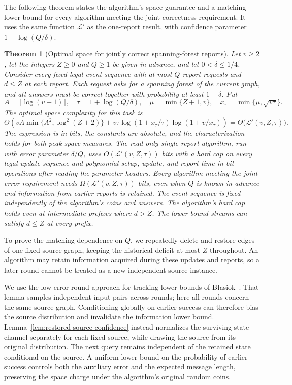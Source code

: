 \documentclass[11pt,letterpaper]{article}
\newtheorem{theorem}{Theorem}[section]
\numberwithin{equation}{section}
\begin{document}
The following theorem states the algorithm's space guarantee and a matching lower bound for every algorithm meeting the joint correctness requirement.
It uses the same function $\mathcal L'$ as the one-report result, with confidence parameter $1+\log(Q/\delta)$.

\begin{theorem}[Optimal space for jointly correct spanning-forest reports]
\label{thm:joint-report-implementation}
Let $v\ge2$, let the integers $Z\ge0$ and $Q\ge1$ be given in advance, and let $0<\delta\le1/4$.
Consider every fixed legal event sequence with at most $Q$ report requests and $d\le Z$ at each report.
Each request asks for a spanning forest of the current graph, and all answers must be correct together with probability at least $1-\delta$.
Put
\[
 A=\lceil\log(v+1)\rceil,\quad
 \tau=1+\log(Q/\delta),\quad
 \mu=\min\{Z+1,v\},\quad x_\tau=\min\{\mu,\sqrt{v\tau}\}.
\]
The optimal space complexity for this task is
\begin{equation}
\Theta\!\left(
 vA\min\{A^2,\log^2(Z+2)\}
 +v\tau\log(1+x_\tau/\tau)\log(1+v/x_\tau)
 \right)
 =\Theta\bigl(\mathcal L'(v,Z,\tau)\bigr).          \label{eq:sj9}
\end{equation}
The expression is in bits, the constants are absolute, and the characterization holds for both peak-space measures.
The read-only single-report algorithm, run with error parameter $\delta/Q$, uses $O(\mathcal L'(v,Z,\tau))$ bits with a hard cap on every legal update sequence and polynomial setup, update, and report time in bit operations after reading the parameter headers.
Every algorithm meeting the joint error requirement needs $\Omega(\mathcal L'(v,Z,\tau))$ bits, even when $Q$ is known in advance and information from earlier reports is retained.
The event sequence is fixed independently of the algorithm's coins and answers.
The algorithm's hard cap holds even at intermediate prefixes where $d>Z$.
The lower-bound streams can satisfy $d\le Z$ at every prefix.
\end{theorem}

To prove the matching dependence on $Q$, we repeatedly delete and restore edges of one fixed source graph, keeping the historical deficit at most $Z$ throughout.
An algorithm may retain information acquired during these updates and reports, so a later round cannot be treated as a new independent source instance.

We use the low-error-round approach for tracking lower bounds of B{\l}asiok~\cite[Section~7, Lemma~29 of the full version]{Blasiok2018}.
That lemma samples independent input pairs across rounds; here all rounds concern the same source graph.
Conditioning globally on earlier success can therefore bias the source distribution and invalidate the information lower bound.
Lemma~\ref{lem:restored-source-confidence} instead normalizes the surviving state channel separately for each fixed source, while drawing the source from its original distribution.
The next query remains independent of the retained state conditional on the source.
A uniform lower bound on the probability of earlier success controls both the auxiliary error and the expected message length, preserving the space charge under the algorithm's original random coins.
\end{document}
